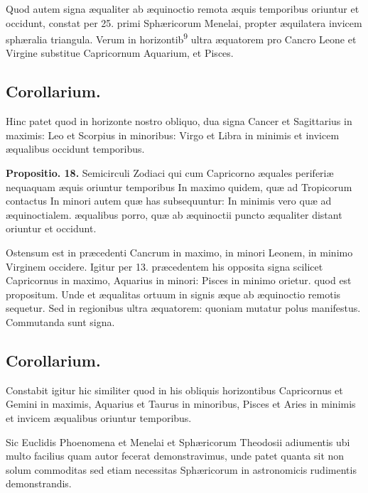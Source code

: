 \documentclass[11pt,a4paper]{article}
\begin{document}
Quod autem signa æqualiter ab æquinoctio remota æquis temporibus oriuntur et occidunt, constat per 25. primi Sphæricorum Menelai, propter æquilatera invicem sphæralia triangula. Verum in horizontib\textsuperscript{9} ultra æquatorem pro Cancro Leone et Virgine substitue Capricornum Aquarium, et Pisces.

\subsection*{Corollarium.}

Hinc patet quod in horizonte nostro obliquo, dua signa Cancer et Sagittarius in maximis: Leo et Scorpius in minoribus: Virgo et Libra in minimis et invicem æqualibus occidunt temporibus.

\textbf{Propositio. 18.} Semicirculi Zodiaci qui cum Capricorno æquales periferiæ nequaquam æquis oriuntur temporibus In maximo quidem, quæ ad Tropicorum contactus In minori autem quæ has subsequuntur: In minimis vero quæ ad æquinoctialem. æqualibus porro, quæ ab æquinoctii puncto æqualiter distant oriuntur et occidunt.

Ostensum est in præcedenti Cancrum in maximo, in minori Leonem, in minimo Virginem occidere. Igitur per 13. præcedentem his opposita signa scilicet Capricornus in maximo, Aquarius in minori: Pisces in minimo orietur. quod est propositum. Unde et æqualitas ortuum in signis æque ab æquinoctio remotis sequetur. Sed in regionibus ultra æquatorem: quoniam mutatur polus manifestus. Commutanda sunt signa.

\subsection*{Corollarium.}

Constabit igitur hic similiter quod in his obliquis horizontibus Capricornus et Gemini in maximis, Aquarius et Taurus in minoribus, Pisces et Aries in minimis et invicem æqualibus oriuntur temporibus.

Sic Euclidis Phoenomena et Menelai et Sphæricorum Theodosii adiumentis ubi multo facilius quam autor fecerat demonstravimus, unde patet quanta sit non solum commoditas sed etiam necessitas Sphæricorum in astronomicis rudimentis demonstrandis.
\end{document}
